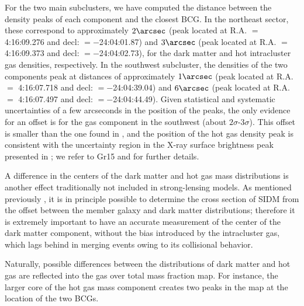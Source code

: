 \documentclass[twocolumn]{aastex61}
\begin{document}
For the two main subclusters, we have computed the distance between the density
peaks of each component and the closest BCG.
In the northeast sector, these correspond to approximately $2\arcsec$ (peak
located at R.A. $=$ 4:16:09.276 and decl: $= -$24:04:01.87) and $3\arcsec$ (peak
located at R.A. $=$ 4:16:09.373 and decl: $= -$24:04:02.73), for the dark matter and
hot intracluster gas densities, respectively.
In the southwest subcluster, the densities of the two components peak at distances of
approximately $1\arcsec$ (peak located at R.A. $=$ 4:16:07.718 and 
decl: $= -$24:04:39.04) and $6\arcsec$ (peak located at R.A. $=$ 4:16:07.497 and
decl: $= -$24:04:44.49).
Given statistical and systematic uncertainties of a few arcseconds in the
position of the peaks, the only evidence for an offset is for the gas component
in the southwest (about $2\sigma$-$3\sigma$).
This offset is smaller than the one found in \citet{Jauzac2015}, and the position
of the hot gas density peak is consistent with the uncertainty region in the
X-ray surface brightness peak presented in \citet{Ogrean2015}; we refer to Gr15
and \citet{Balestra2016} for further details.

A difference in the centers of the dark matter and hot gas mass distributions is
another effect traditionally not included in strong-lensing models.
As mentioned previously \citep[see Section \ref{sec:intro} and][]{Markevitch2004},
it is in principle possible to determine the cross section of SIDM
from the offset between the member galaxy and dark matter distributions;
therefore it is extremely important to have an accurate measurement of the
center of the dark matter component, without the bias introduced by the intracluster
gas, which lags behind in merging events owing to its collisional behavior.

Naturally, possible differences between the distributions of dark matter and hot
gas are reflected into the gas over total mass fraction map.
For instance, the larger core of the hot gas mass component creates two peaks in
the map at the location of the two BCGs.
\end{document}
